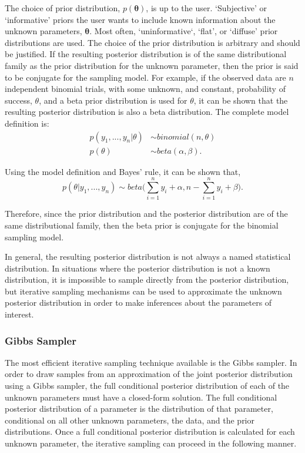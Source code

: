 \documentclass[12pt]{article}\usepackage[]{graphicx}\usepackage[]{color}
\begin{document}
\noindent The choice of prior distribution, $p(\bm{\theta})$, is up to the user. `Subjective' or `informative' priors the user wants to include known information about the unknown parameters, $\bm{\theta}$. Most often, `uninformative`, `flat', or `diffuse' prior distributions are used. The choice of the prior distribution is arbitrary and should be justified. If the resulting posterior distribution is of the same distributional family as the prior distribution for the unknown parameter, then the prior is said to be conjugate for the sampling model. For example, if the observed data are $n$ independent binomial trials, with some unknown, and constant, probability of success, $\theta$, and a beta prior distribution is used for $\theta$, it can be shown that the resulting posterior distribution is also a beta distribution. The complete model definition is: 
$$
\begin{aligned}
p(y_1, ..., y_n|\theta) &\sim binomial(n, \theta)\\
p(\theta) &\sim beta(\alpha, \beta).
\end{aligned}
$$

\noindent Using the model definition and Bayes' rule, it can be shown that, 
$$p(\theta|y_1, ..., y_n) \sim beta \bigg( \sum_{i = 1}^n y_i + \alpha, n - \sum_{i = 1}^n y_i + \beta \bigg).$$

\noindent Therefore, since the prior distribution and the posterior distribution are of the same distributional family, then the beta prior is conjugate for the binomial sampling model.

In general, the resulting posterior distribution is not always a named statistical distribution. In situations where the posterior distribution is not a known distribution, it is impossible to sample directly from the posterior distribution, but iterative sampling mechanisms can be used to approximate the unknown posterior distribution in order to make inferences about the parameters of interest. 

\subsubsection{Gibbs Sampler}

The most efficient iterative sampling technique available is the Gibbs sampler. In order to draw samples from an approximation of the joint posterior distribution using a Gibbs sampler, the full conditional posterior distribution of each of the unknown parameters must have a closed-form solution. The full conditional posterior distribution of a parameter is the distribution of that parameter, conditional on all other unknown parameters, the data, and the prior distributions. Once a full conditional posterior distribution is calculated for each unknown parameter, the iterative sampling can proceed in the following manner. 
\end{document}
